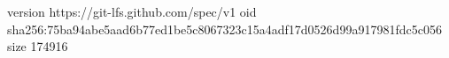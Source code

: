 version https://git-lfs.github.com/spec/v1
oid sha256:75ba94abe5aad6b77ed1be5c8067323c15a4adf17d0526d99a917981fdc5c056
size 174916
